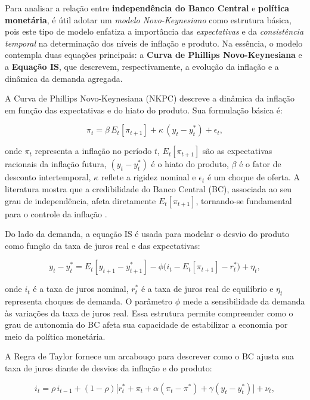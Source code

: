 \documentclass[a4paper,12pt]{article}
\begin{document}
Para analisar a relação entre \textbf{independência do Banco Central} e \textbf{política monetária}, é útil adotar um \emph{modelo Novo-Keynesiano} como estrutura básica, pois este tipo de modelo enfatiza a importância das \emph{expectativas} e da \emph{consistência temporal} na determinação dos níveis de inflação e produto. Na essência, o modelo contempla duas equações principais: a \textbf{Curva de Phillips Novo-Keynesiana} e a \textbf{Equação IS}, que descrevem, respectivamente, a evolução da inflação e a dinâmica da demanda agregada.

A Curva de Phillips Novo-Keynesiana (NKPC) descreve a dinâmica da inflação em função das expectativas e do hiato do produto. Sua formulação básica é:

\begin{equation}
\pi_t = \beta \, E_t[\pi_{t+1}] + \kappa \, (y_t - y_t^*) + \epsilon_t,
\label{eq:nkpc}
\end{equation}

\noindent onde $\pi_t$ representa a inflação no período $t$, $E_t[\pi_{t+1}]$ são as expectativas racionais da inflação futura, $(y_t - y_t^*)$ é o hiato do produto, $\beta$ é o fator de desconto intertemporal, $\kappa$ reflete a rigidez nominal e $\epsilon_t$ é um choque de oferta. A literatura mostra que a credibilidade do Banco Central (BC), associada ao seu grau de independência, afeta diretamente $E_t[\pi_{t+1}]$, tornando-se fundamental para o controle da inflação \cite{unsal2023, gali2015}.

Do lado da demanda, a equação IS é usada para modelar o desvio do produto como função da taxa de juros real e das expectativas:

\begin{equation}
y_t - y_t^* = E_t[y_{t+1} - y_{t+1}^*] - \phi \big( i_t - E_t[\pi_{t+1}] - r_t^* \big) + \eta_t,
\label{eq:is}
\end{equation}

\noindent onde $i_t$ é a taxa de juros nominal, $r_t^*$ é a taxa de juros real de equilíbrio e $\eta_t$ representa choques de demanda. O parâmetro $\phi$ mede a sensibilidade da demanda às variações da taxa de juros real. Essa estrutura permite compreender como o grau de autonomia do BC afeta sua capacidade de estabilizar a economia por meio da política monetária.

A Regra de Taylor fornece um arcabouço para descrever como o BC ajusta sua taxa de juros diante de desvios da inflação e do produto:

\begin{equation}
i_t = \rho \, i_{t-1} + (1 - \rho) \big[ r_t^* + \pi_t + \alpha (\pi_t - \pi^*) + \gamma (y_t - y_t^*) \big] + \nu_t,
\label{eq:taylor}
\end{equation}
\end{document}
